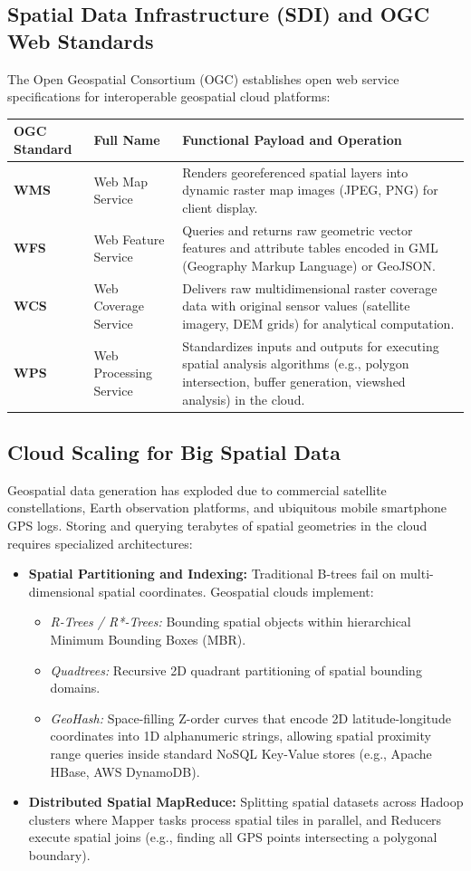 \subsection{Spatial Data Infrastructure (SDI) and OGC Web Standards}
The Open Geospatial Consortium (OGC) establishes open web service specifications for interoperable geospatial cloud platforms:
\begin{center}
\begin{tabularx}{\textwidth}{>{\bfseries}l p{3.5cm} X}
\toprule
OGC Standard & Full Name & Functional Payload and Operation\\
\midrule
WMS & Web Map Service & Renders georeferenced spatial layers into dynamic raster map images (JPEG, PNG) for client display.\\
WFS & Web Feature Service & Queries and returns raw geometric vector features and attribute tables encoded in GML (Geography Markup Language) or GeoJSON.\\
WCS & Web Coverage Service & Delivers raw multidimensional raster coverage data with original sensor values (satellite imagery, DEM grids) for analytical computation.\\
WPS & Web Processing Service & Standardizes inputs and outputs for executing spatial analysis algorithms (e.g., polygon intersection, buffer generation, viewshed analysis) in the cloud.\\
\bottomrule
\end{tabularx}
\end{center}

\subsection{Cloud Scaling for Big Spatial Data}
Geospatial data generation has exploded due to commercial satellite constellations, Earth observation platforms, and ubiquitous mobile smartphone GPS logs. Storing and querying terabytes of spatial geometries in the cloud requires specialized architectures:
\begin{itemize}[leftmargin=*]
  \item \textbf{Spatial Partitioning and Indexing:} Traditional B-trees fail on multi-dimensional spatial coordinates. Geospatial clouds implement:
    \begin{itemize}
      \item \emph{R-Trees / R*-Trees:} Bounding spatial objects within hierarchical Minimum Bounding Boxes (MBR).
      \item \emph{Quadtrees:} Recursive 2D quadrant partitioning of spatial bounding domains.
      \item \emph{GeoHash:} Space-filling Z-order curves that encode 2D latitude-longitude coordinates into 1D alphanumeric strings, allowing spatial proximity range queries inside standard NoSQL Key-Value stores (e.g., Apache HBase, AWS DynamoDB).
    \end{itemize}
  \item \textbf{Distributed Spatial MapReduce:} Splitting spatial datasets across Hadoop clusters where Mapper tasks process spatial tiles in parallel, and Reducers execute spatial joins (e.g., finding all GPS points intersecting a polygonal boundary).
\end{itemize}

